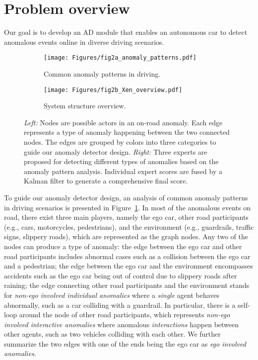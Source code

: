 \section{Problem overview}
\label{sec:overview}

Our goal is to develop an AD module that enables an autonomous car to detect anomalous events online in diverse driving scenarios.

\begin{figure*}[t]
  \centering
  \begin{subfigure}[b]{0.35\linewidth}
    \captionsetup{justification=centering}
    \texttt{[image: Figures/fig2a\_anomaly\_patterns.pdf]}
    \caption{Common anomaly patterns in driving.}
    \label{fig:anomaly-patterns}
  \end{subfigure}
  \begin{subfigure}[b]{0.64\linewidth}
    \captionsetup{justification=centering}
    \texttt{[image: Figures/fig2b\_Xen\_overview.pdf]}
    \caption{System structure overview.}
    \label{fig:Xen-overview}
  \end{subfigure}
  \caption{\textit{Left:} Nodes are possible actors in an on-road anomaly. Each edge represents a type of anomaly happening between the two connected nodes. The edges are grouped by colors into three categories to guide our anomaly detector design. \textit{Right:} Three experts are proposed for detecting different types of anomalies based on the anomaly pattern analysis. Individual expert scores are fused by a Kalman filter to generate a comprehensive final score.}
  \label{fig:problem-overview}
\end{figure*}

To guide our anomaly detector design, an analysis of common anomaly patterns in driving scenarios is presented in Figure~\ref{fig:anomaly-patterns}. In most of the anomalous events on road, there exist three main players, namely the ego car, other road participants (e.g., cars, motorcycles, pedestrians), and the environment (e.g., guardrails, traffic signs, slippery roads), which are represented as the graph nodes. Any two of the nodes can produce a type of anomaly: the edge between the ego car and other road participants includes abnormal cases such as a collision between the ego car and a pedestrian; the edge between the ego car and the environment encompasses accidents such as the ego car being out of control due to slippery roads after raining; the edge connecting other road participants and the environment stands for \textit{non-ego involved individual anomalies} where a \textit{single} agent behaves abnormally, such as a car colliding with a guardrail. In particular, there is a self-loop around the node of other road participants, which represents \textit{non-ego involved interactive anomalies} where anomalous \textit{interactions} happen between other agents, such as two vehicles colliding with each other. We further summarize the two edges with one of the ends being the ego car as \textit{ego involved anomalies}.

